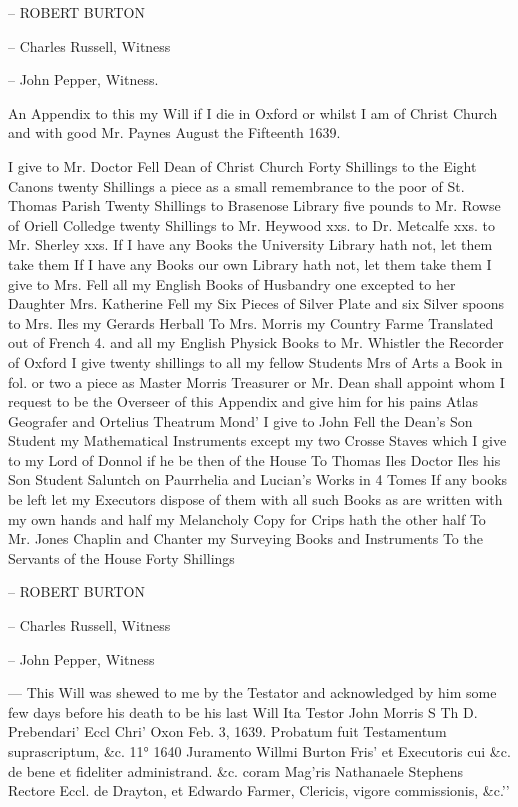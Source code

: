 \documentclass[titlepage,12pt,a4]{octavo}
\begin{document}
{-- ROBERT BURTON

-- Charles Russell, Witness

-- John Pepper, Witness.

An Appendix to this my Will if I die in Oxford or whilst I am of Christ Church and with good Mr. Paynes August the Fifteenth 1639.

I give to Mr. Doctor Fell Dean of Christ Church Forty Shillings to the Eight Canons twenty Shillings a piece as a small remembrance to the poor of St. Thomas Parish Twenty Shillings to Brasenose Library five pounds to Mr. Rowse of Oriell Colledge twenty Shillings to Mr. Heywood xxs. to Dr. Metcalfe xxs. to Mr. Sherley xxs. If I have any Books the University Library hath not, let them take them If I have any Books our own Library hath not, let them take them I give to Mrs. Fell all my English Books of Husbandry one excepted to her Daughter Mrs. Katherine Fell my Six Pieces of Silver Plate and six Silver spoons to Mrs. Iles my Gerards Herball To Mrs. Morris my Country Farme Translated out of French 4. and all my English Physick Books to Mr. Whistler the Recorder of Oxford I give twenty shillings to all my fellow Students Mrs of Arts a Book in fol. or two a piece as Master Morris Treasurer or Mr. Dean shall appoint whom I request to be the Overseer of this Appendix and give him for his pains Atlas Geografer and Ortelius Theatrum Mond' I give to John Fell the Dean's Son Student my Mathematical Instruments except my two Crosse Staves which I give to my Lord of Donnol if he be then of the House To Thomas Iles Doctor Iles his Son Student Saluntch on Paurrhelia and Lucian's Works in 4 Tomes If any books be left let my Executors dispose of them with all such Books as are written with my own hands and half my Melancholy Copy for Crips hath the other half To Mr. Jones Chaplin and Chanter my Surveying Books and Instruments To the Servants of the House Forty Shillings

-- ROBERT BURTON

-- Charles Russell, Witness

-- John Pepper, Witness

--- This Will was shewed to me by the Testator and acknowledged by him some few days before his death to be his last Will Ita Testor John Morris S Th D. Prebendari' Eccl Chri' Oxon Feb. 3, 1639. Probatum fuit Testamentum suprascriptum, \&c. 11° 1640 Juramento Willmi Burton Fris' et Executoris cui \&c. de bene et fideliter administrand. \&c. coram Mag'ris Nathanaele Stephens Rectore Eccl. de Drayton, et Edwardo Farmer, Clericis, vigore commissionis, \&c.\rq\rq}
\clearpage
\mainmatter





\end{document}
